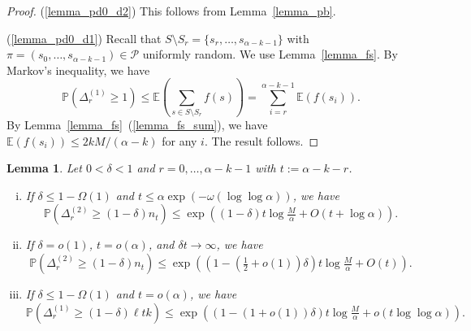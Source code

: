 \documentclass{article}
\theoremstyle{plain}
\theoremstyle{remark}
\theoremstyle{plain}
\newtheorem{lemma}[theorem]{Lemma}
\numberwithin{equation}{section}
\begin{document}
	\begin{proof}
		(\ref{lemma_pd0_d2}) This follows from Lemma~\ref{lemma_pb}.
		
		(\ref{lemma_pd0_d1}) Recall that $S\setminus S_r=\{s_r,\ldots,s_{\alpha-k-1}\}$ with $\pi=(s_0,\ldots,s_{\alpha-k-1})\in\mathcal{P}$ uniformly random. We use Lemma~\ref{lemma_fs}. By Markov's inequality, we have $$\mathbb{P}(\Delta_r^{(1)}\geq1)\leq\mathbb{E}\left(\sum_{s\in S\setminus S_r}f(s)\right)=\sum_{i=r}^{\alpha-k-1}\mathbb{E}(f(s_i)).$$ By Lemma~\ref{lemma_fs}~(\ref{lemma_fs_sum}), we have $\mathbb{E}(f(s_i))\leq2kM/(\alpha-k)$ for any $i$. The result follows.
	\end{proof}
	
	\begin{lemma}\label{lemma_pd}
		Let $0<\delta<1$ and $r=0,\ldots,\alpha-k-1$ with $t:=\alpha-k-r$.
		\begin{enumerate}[(i)]
			\item\label{lemma_pd_2small} If $\delta\leq1-\Omega(1)$ and $t\leq\alpha\exp(-\omega(\log\log\alpha))$, we have $$\mathbb{P}(\Delta_r^{(2)}\geq(1-\delta)n_t)\leq\exp\left((1-\delta)t\log\tfrac{M}{\alpha}+O(t+\log\alpha)\right).$$
			\item\label{lemma_pd_2large} If $\delta=o(1)$, $t=o(\alpha)$, and $\delta t\to\infty$, we have $$\mathbb{P}(\Delta_r^{(2)}\geq(1-\delta)n_t)\leq\exp\left((1-(\tfrac12+o(1))\delta)t\log\tfrac{M}{\alpha}+O(t)\right).$$
			\item\label{lemma_pd_1} If $\delta\leq1-\Omega(1)$ and $t=o(\alpha)$, we have $$\mathbb{P}(\Delta_r^{(1)}\geq(1-\delta)\ell tk)\leq\exp\left((1-(1+o(1))\delta)t\log\tfrac{M}{\alpha}+o(t\log\log\alpha)\right).$$
		\end{enumerate}
	\end{lemma}
	
\end{document}
